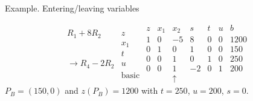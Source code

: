 \documentclass[c]{beamer}
\begin{document}
\begin{frame}{Example. Entering/leaving variables}

\begin{equation*}
\begin{array}{cc}
&\\
R_1+8R_2&z \\
&x_1 \\
&t \\
\rightarrow R_4-2R_2&u\\
&\mathrm{basic} \\
\end{array}
\begin{array}{c|ccccc|c}
  z & x_1 & x_2 & s & t & u & b \\ \hline
  1 & 0 & -5 & 8 & 0 & 0 & 1200 \\ \hline
  0 & 1 & 0 & 1 & 0 & 0 & 150  \\
  0 & 0 & 1 & 0 & 1 & 0 & 250 \\
  0 & 0 & 1 & -2 & 0 & 1 & 200 \\
    &  & \uparrow& & & &
\end{array}
\end{equation*}
$P_B=(150,0)$ and $z(P_B)=1200$ with $t=250$, $u=200$, $s=0$.
\end{frame}
\end{document}
